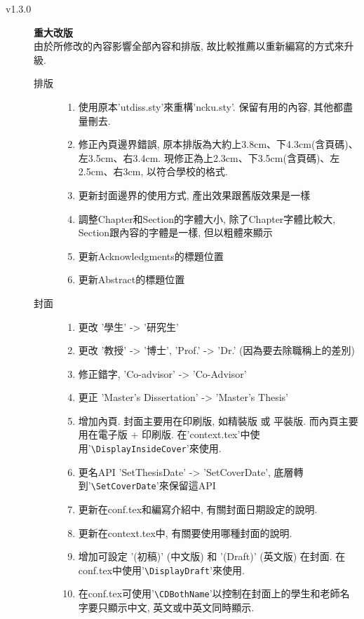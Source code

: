 \begin{description}
  \item[v1.3.0] \textbf{重大改版}\\
    由於所修改的內容影響全部內容和排版, 故比較推薦以重新編寫的方式來升級.\hfill
    \begin{description}
      \item[排版] \hfill
        \begin{enumerate}
          \item 使用原本'utdiss.sty'來重構'ncku.sty'. 保留有用的內容, 其他都盡量刪去.
          \item 修正內頁邊界錯誤, 原本排版為大約上3.8cm、下4.3cm(含頁碼)、左3.5cm、右3.4cm. 現修正為上2.3cm、下3.5cm(含頁碼)、左2.5cm、右3cm, 以符合學校的格式.
          \item 更新封面邊界的使用方式, 產出效果跟舊版效果是一樣
          \item 調整Chapter和Section的字體大小, 除了Chapter字體比較大, Section跟內容的字體是一樣, 但以粗體來顯示
          \item 更新Acknowledgments的標題位置
          \item 更新Abstract的標題位置
        \end{enumerate}
      \item[封面] \hfill
        \begin{enumerate}
          \item 更改 '學生' -> '研究生'
          \item 更改 '教授' -> '博士', 'Prof.' -> 'Dr.' (因為要去除職稱上的差別)
          \item 修正錯字, 'Co-advisor' -> 'Co-Advisor'
          \item 更正 'Master's Dissertation' -> 'Master's Thesis'
          \item 增加內頁. 封面主要用在印刷版, 如精裝版 或 平裝版. 而內頁主要用在電子版 + 印刷版. 在'context.tex'中使用'\verb|\DisplayInsideCover|'來使用.
          \item 更名API 'SetThesisDate' -> 'SetCoverDate', 底層轉到'\verb|\SetCoverDate|'來保留這API
          \item 更新在conf.tex和編寫介紹中, 有關封面日期設定的說明.
          \item 更新在context.tex中, 有關要使用哪種封面的說明.
          \item 增加可設定 '(初稿)' (中文版) 和 '(Draft)' (英文版) 在封面. 在conf.tex中使用'\verb|\DisplayDraft|'來使用.
          \item 在conf.tex可使用'\verb|\CDBothName|'以控制在封面上的學生和老師名字要只顯示中文, 英文或中英文同時顯示.

\end{enumerate}
\end{description}
\end{description}

